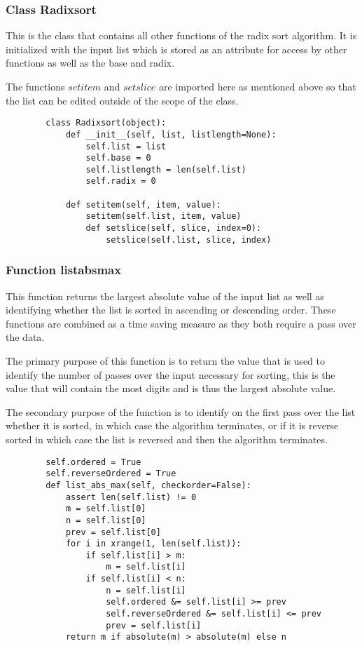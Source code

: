 \documentclass[12pt]{article}
\begin{document}
\subsubsection{Class Radixsort}
This is the class that contains all other functions of the radix sort algorithm. It is initialized with the input list which is stored as an attribute for access by other functions as well as the base and radix.\par
\par
The functions $setitem$ and $setslice$ are imported here as mentioned above so that the list can be edited outside of the scope of the class.
\begin{lstlisting}
        class Radixsort(object):
            def __init__(self, list, listlength=None):
                self.list = list
                self.base = 0
                self.listlength = len(self.list)
                self.radix = 0
    
            def setitem(self, item, value):
                setitem(self.list, item, value)
				def setslice(self, slice, index=0):
					setslice(self.list, slice, index)
      \end{lstlisting}

\subsubsection{Function list\textunderscore abs\textunderscore max}
This function returns the largest absolute value of the input list as well as identifying whether the list is sorted in ascending or descending order. These functions are combined as a time saving measure as they both require a pass over the data.
\par
The primary purpose of this function is to return the value that is used to identify the number of passes over the input necessary for sorting, this is the value that will contain the most digits and is thus the largest absolute value. 
\par
The secondary purpose of the function is to identify on the first pass over the list whether it is sorted, in which case the algorithm terminates, or if it is reverse sorted in which case the list is reversed and then the algorithm terminates.
\begin{lstlisting}
        self.ordered = True
        self.reverseOrdered = True
        def list_abs_max(self, checkorder=False):
            assert len(self.list) != 0
            m = self.list[0]
            n = self.list[0]
            prev = self.list[0]
            for i in xrange(1, len(self.list)):
                if self.list[i] > m:
                    m = self.list[i]
                if self.list[i] < n:
                    n = self.list[i]
					self.ordered &= self.list[i] >= prev
					self.reverseOrdered &= self.list[i] <= prev
					prev = self.list[i]
            return m if absolute(m) > absolute(m) else n
      \end{lstlisting}
\pagebreak
\end{document}
